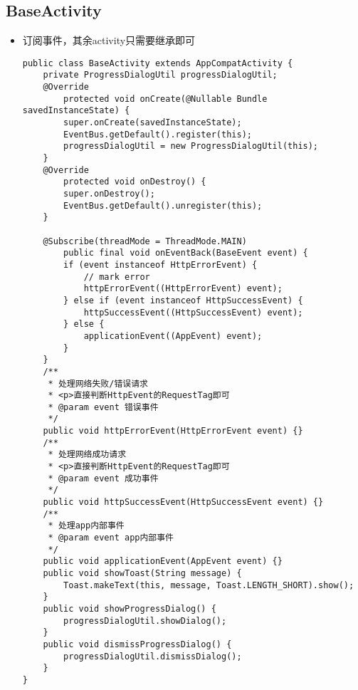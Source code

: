 \documentclass[9pt, b5paper]{article}
\begin{document}
\subsection{BaseActivity}
\label{sec-4-9}
\begin{itemize}
\item 订阅事件，其余activity只需要继承即可
\begin{verbatim}
public class BaseActivity extends AppCompatActivity {
    private ProgressDialogUtil progressDialogUtil;
    @Override
        protected void onCreate(@Nullable Bundle savedInstanceState) {
        super.onCreate(savedInstanceState);
        EventBus.getDefault().register(this);
        progressDialogUtil = new ProgressDialogUtil(this);
    }
    @Override
        protected void onDestroy() {
        super.onDestroy();
        EventBus.getDefault().unregister(this);
    }

    @Subscribe(threadMode = ThreadMode.MAIN)
        public final void onEventBack(BaseEvent event) {
        if (event instanceof HttpErrorEvent) {
            // mark error
            httpErrorEvent((HttpErrorEvent) event);
        } else if (event instanceof HttpSuccessEvent) {
            httpSuccessEvent((HttpSuccessEvent) event);
        } else {
            applicationEvent((AppEvent) event);
        }
    }
    /**
     * 处理网络失败/错误请求
     * <p>直接判断HttpEvent的RequestTag即可
     * @param event 错误事件
     */
    public void httpErrorEvent(HttpErrorEvent event) {}
    /**
     * 处理网络成功请求
     * <p>直接判断HttpEvent的RequestTag即可
     * @param event 成功事件
     */
    public void httpSuccessEvent(HttpSuccessEvent event) {}
    /**
     * 处理app内部事件
     * @param event app内部事件
     */
    public void applicationEvent(AppEvent event) {}
    public void showToast(String message) {
        Toast.makeText(this, message, Toast.LENGTH_SHORT).show();
    }
    public void showProgressDialog() {
        progressDialogUtil.showDialog();
    }
    public void dismissProgressDialog() {
        progressDialogUtil.dismissDialog();
    }
}
\end{verbatim}
\end{itemize}
\end{document}

